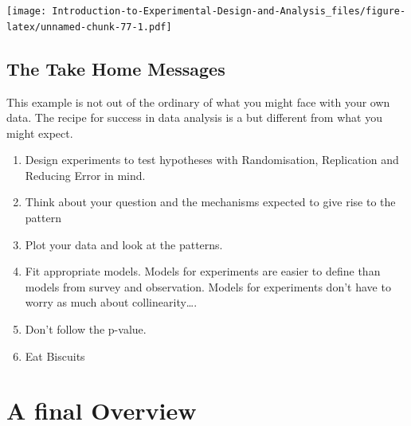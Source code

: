 \documentclass[
]{book}
\providecommand{\tightlist}{%
  \setlength{\itemsep}{0pt}\setlength{\parskip}{0pt}}
\begin{document}
\texttt{[image: Introduction-to-Experimental-Design-and-Analysis\_files/figure-latex/unnamed-chunk-77-1.pdf]}

\hypertarget{the-take-home-messages}{%
\section{The Take Home Messages}\label{the-take-home-messages}}

This example is not out of the ordinary of what you might face with your own data. The recipe for success in data analysis is a but different from what you might expect.

\begin{enumerate}
\def\labelenumi{\arabic{enumi}.}
\tightlist
\item
  Design experiments to test hypotheses with Randomisation, Replication and Reducing Error in mind.
\item
  Think about your question and the mechanisms expected to give rise to the pattern
\item
  Plot your data and look at the patterns.
\item
  Fit appropriate models. Models for experiments are easier to define than models from survey and observation. Models for experiments don't have to worry as much about collinearity\ldots.
\item
  Don't follow the p-value.
\item
  Eat Biscuits
\end{enumerate}

\hypertarget{a-final-overview}{%
\chapter{A final Overview}\label{a-final-overview}}

  
\end{document}
